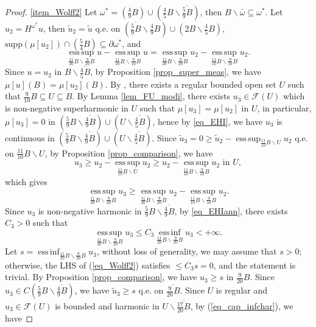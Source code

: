 \documentclass[11pt,a4paper]{article}
\numberwithin{equation}{section}
\newcommand{\esup}{\operatorname*{ess\,sup}}
\newcommand{\einf}{\operatorname*{ess\,inf}}
\theoremstyle{plain}
\theoremstyle{definition}
\begin{document}
\begin{proof}
\ref{item_Wolff2} Let $\omega^*=\left(\frac{4}{9}B\right)\cup \left(\frac{4}{5}B\backslash \overline{\frac{5}{9}B}\right)$, then $B\backslash \overline{\omega}\subseteq \omega^*$. Let $u_2=H^{\omega^*}u$, then $\widetilde{u}_2=\widetilde{u}$ q.e. on $\left(\overline{\frac{5}{9}B}\backslash {\frac{4}{9}B}\right)\cup \left(2B\backslash {\frac{4}{5}B}\right)$, $\mathrm{supp}(\mu[u_2])\cap \left(\frac{5}{4}B\right)\subseteq \partial \omega^*$, and
$$\esup_{\frac{11}{20}B\backslash {\frac{9}{20}B}}u-\esup_{\frac{11}{10}B\backslash {\frac{9}{10}B}}u=\esup_{\frac{11}{20}B\backslash {\frac{9}{20}B}}u_2-\esup_{\frac{11}{10}B\backslash {\frac{9}{10}B}}u_2.$$
Since $u=u_2$ in $B\backslash \overline{\frac{4}{5}B}$, by Proposition \ref{prop_super_meas}, we have $\mu[u](B)=\mu[u_2](B)$. By \hyperlink{eq_RBA}{}, there exists a regular bounded open set $U$ such that $\frac{9}{10}B\subseteq U\subseteq B$. By Lemma \ref{lem_FU_modi}, there exists $u_3\in \mathcal{F}(U)$ which is non-negative superharmonic in $U$ such that $\mu[u_3]=\mu[u_2]$ in $U$, in particular, $\mu[u_3]=0$ in $\left(\frac{5}{9}B\backslash \overline{\frac{4}{9}B}\right)\cup \left(U\backslash \overline{\frac{4}{5}B}\right)$, hence by \ref{eq_EHI}, we have $u_3$ is continuous in $\left(\frac{5}{9}B\backslash \overline{\frac{4}{9}B}\right)\cup \left(U\backslash \overline{\frac{4}{5}B}\right)$. Since $\widetilde{u}_3=0\ge \widetilde{u}_2-\esup_{\frac{11}{10}B\backslash U}u_2$ q.e. on $\frac{11}{10}B\backslash U$, by Proposition \ref{prop_comparison}, we have
$$u_3\ge u_2-\esup_{\frac{11}{10}B\backslash {U}}u_2\ge u_2-\esup_{\frac{11}{10}B\backslash {\frac{9}{10}B}}u_2\text{ in }U,$$
which gives
$$\esup_{\frac{11}{20}B\backslash \frac{9}{20}B}u_3\ge \esup_{\frac{11}{20}B\backslash \frac{9}{20}B}u_2-\esup_{\frac{11}{10}B\backslash \frac{9}{10}B}u_2.$$
Since $u_3$ is non-negative harmonic in $\frac{5}{9}B\backslash \overline{\frac{4}{9}B}$, by \ref{eq_EHIann}, there exists $C_3>0$ such that
$$\esup_{\frac{11}{20}B\backslash {\frac{9}{20}B}}u_3\le C_3\einf_{\frac{11}{20}B\backslash {\frac{9}{20}B}}u_3<+\infty.$$
Let $s=\einf_{\frac{11}{20}B\backslash \frac{9}{20}B}u_3$, without loss of generality, we may assume that $s>0$; otherwise, the LHS of (\ref{eq_Wolff2}) satisfies $\le C_3s=0$, and the statement is trivial. By Proposition \ref{prop_comparison}, we have $u_3\ge s$ in $\frac{9}{20}B$. Since $u_3\in C\left(\frac{5}{9}B\backslash \overline{\frac{4}{9}B}\right)$, we have $\widetilde{u}_3\ge s$ q.e. on $\overline{\frac{9}{20}B}$. Since $U$ is regular and $u_3\in \mathcal{F}(U)$ is bounded and harmonic in $U\backslash \overline{\frac{17}{20}B}$, by (\ref{eq_cap_infchar}), we have

\end{proof}
\end{document}
